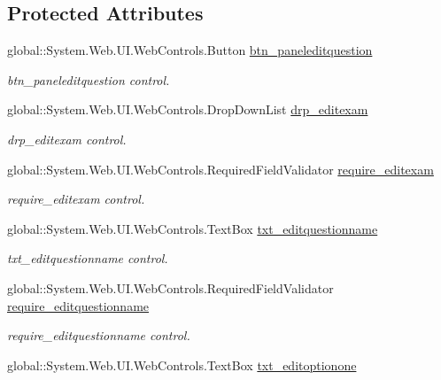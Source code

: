\subsection*{Protected Attributes}
\begin{DoxyCompactItemize}
\item 
global\+::\+System.\+Web.\+U\+I.\+Web\+Controls.\+Button \mbox{\hyperlink{class_admin__editquestion_aafd51bc386c07fa3a8ead03a290029e1}{btn\+\_\+paneleditquestion}}
\begin{DoxyCompactList}\small\item\em btn\+\_\+paneleditquestion control. \end{DoxyCompactList}\item 
global\+::\+System.\+Web.\+U\+I.\+Web\+Controls.\+Drop\+Down\+List \mbox{\hyperlink{class_admin__editquestion_a43127ac3fecd9c97674566121f157521}{drp\+\_\+editexam}}
\begin{DoxyCompactList}\small\item\em drp\+\_\+editexam control. \end{DoxyCompactList}\item 
global\+::\+System.\+Web.\+U\+I.\+Web\+Controls.\+Required\+Field\+Validator \mbox{\hyperlink{class_admin__editquestion_a5d1f80c1e0153993f4ba971555805e60}{require\+\_\+editexam}}
\begin{DoxyCompactList}\small\item\em require\+\_\+editexam control. \end{DoxyCompactList}\item 
global\+::\+System.\+Web.\+U\+I.\+Web\+Controls.\+Text\+Box \mbox{\hyperlink{class_admin__editquestion_a777b9c4ca97baf7bfdb2748b10f4f88e}{txt\+\_\+editquestionname}}
\begin{DoxyCompactList}\small\item\em txt\+\_\+editquestionname control. \end{DoxyCompactList}\item 
global\+::\+System.\+Web.\+U\+I.\+Web\+Controls.\+Required\+Field\+Validator \mbox{\hyperlink{class_admin__editquestion_a368bf7a308684901b9fe901cee1a0cb6}{require\+\_\+editquestionname}}
\begin{DoxyCompactList}\small\item\em require\+\_\+editquestionname control. \end{DoxyCompactList}\item 
global\+::\+System.\+Web.\+U\+I.\+Web\+Controls.\+Text\+Box \mbox{\hyperlink{class_admin__editquestion_a2f4d1c7a0a5e1d1ed5c7661f7e944eec}{txt\+\_\+editoptionone}}

\end{DoxyCompactItemize}
